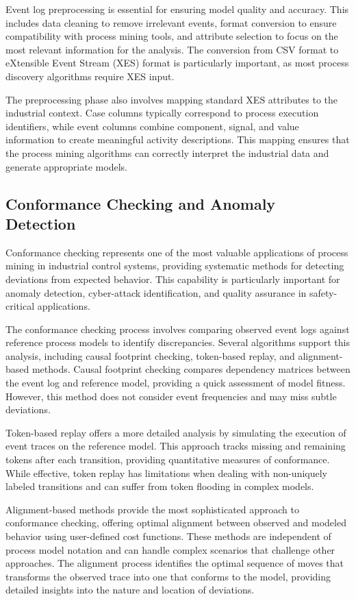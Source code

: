 Event log preprocessing is essential for ensuring model quality and accuracy. This includes data cleaning to remove irrelevant events, format conversion to ensure compatibility with process mining tools, and attribute selection to focus on the most relevant information for the analysis. The conversion from CSV format to eXtensible Event Stream (XES) format is particularly important, as most process discovery algorithms require XES input.


The preprocessing phase also involves mapping standard XES attributes to the industrial context. Case columns typically correspond to process execution identifiers, while event columns combine component, signal, and value information to create meaningful activity descriptions. This mapping ensures that the process mining algorithms can correctly interpret the industrial data and generate appropriate models.

\subsection{Conformance Checking and Anomaly Detection}

Conformance checking represents one of the most valuable applications of process mining in industrial control systems, providing systematic methods for detecting deviations from expected behavior. This capability is particularly important for anomaly detection, cyber-attack identification, and quality assurance in safety-critical applications.

The conformance checking process involves comparing observed event logs against reference process models to identify discrepancies. Several algorithms support this analysis, including causal footprint checking, token-based replay, and alignment-based methods. Causal footprint checking compares dependency matrices between the event log and reference model, providing a quick assessment of model fitness. However, this method does not consider event frequencies and may miss subtle deviations.

Token-based replay offers a more detailed analysis by simulating the execution of event traces on the reference model. This approach tracks missing and remaining tokens after each transition, providing quantitative measures of conformance. While effective, token replay has limitations when dealing with non-uniquely labeled transitions and can suffer from token flooding in complex models.

Alignment-based methods provide the most sophisticated approach to conformance checking, offering optimal alignment between observed and modeled behavior using user-defined cost functions. These methods are independent of process model notation and can handle complex scenarios that challenge other approaches. The alignment process identifies the optimal sequence of moves that transforms the observed trace into one that conforms to the model, providing detailed insights into the nature and location of deviations.


